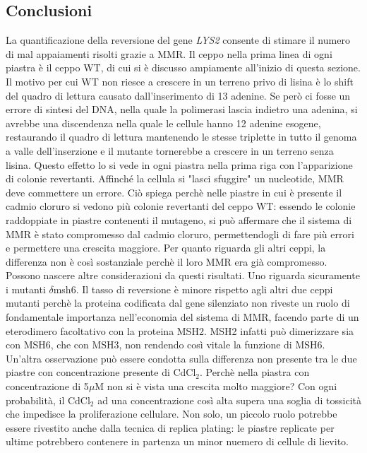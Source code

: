 \subsection*{Conclusioni}
La quantificazione della reversione del gene \emph{LYS2} consente di stimare il numero di mal appaiamenti risolti grazie a MMR. 
Il ceppo nella prima linea di ogni piastra è il ceppo WT, di cui si è discusso ampiamente all'inizio di questa sezione. 
Il motivo per cui WT non riesce a crescere in un terreno privo di lisina è lo shift del quadro di lettura causato dall'inserimento di 13 adenine. 
Se però ci fosse un errore di sintesi del DNA, nella quale la polimerasi lascia indietro una adenina, si avrebbe una discendenza nella quale le cellule hanno 12 adenine esogene, restaurando il quadro di lettura mantenendo le stesse triplette in tutto il genoma a valle dell'inserzione e il mutante tornerebbe a crescere in un terreno senza lisina. 
Questo effetto lo si vede in ogni piastra nella prima riga con l'apparizione di colonie revertanti. 
Affinché la cellula si "lasci sfuggire" un nucleotide, MMR deve commettere un errore. 
Ciò spiega perchè nelle piastre in cui è presente il cadmio cloruro si vedono più colonie revertanti del ceppo WT: essendo le colonie raddoppiate in piastre contenenti il mutageno, si può affermare che il sistema di MMR è stato compromesso dal cadmio cloruro, permettendogli di fare più errori e permettere una crescita maggiore. 
Per quanto riguarda gli altri ceppi, la differenza non è così sostanziale perchè il loro MMR era già compromesso. 
Possono nascere altre considerazioni da questi risultati. 
Uno riguarda sicuramente i mutanti $\delta$msh6. 
Il tasso di reversione è minore rispetto agli altri due ceppi mutanti perchè la proteina codificata dal gene silenziato non riveste un ruolo di fondamentale importanza nell'economia del sistema di MMR, facendo parte di un eterodimero facoltativo con la proteina MSH2. 
MSH2 infatti può dimerizzare sia con MSH6, che con MSH3, non rendendo così vitale la funzione di MSH6. 
Un'altra osservazione può essere condotta sulla differenza non presente tra le due piastre con concentrazione presente di CdCl$_{2}$. 
Perchè nella piastra con concentrazione di 5$\mu$M non si è vista una crescita molto maggiore? Con ogni probabilità, il CdCl$_{2}$ ad una concentrazione così alta supera una soglia di tossicità che impedisce la proliferazione cellulare. 
Non solo, un piccolo ruolo potrebbe essere rivestito anche dalla tecnica di replica plating: le piastre replicate per ultime potrebbero contenere in partenza un minor nuemero di cellule di lievito. 
